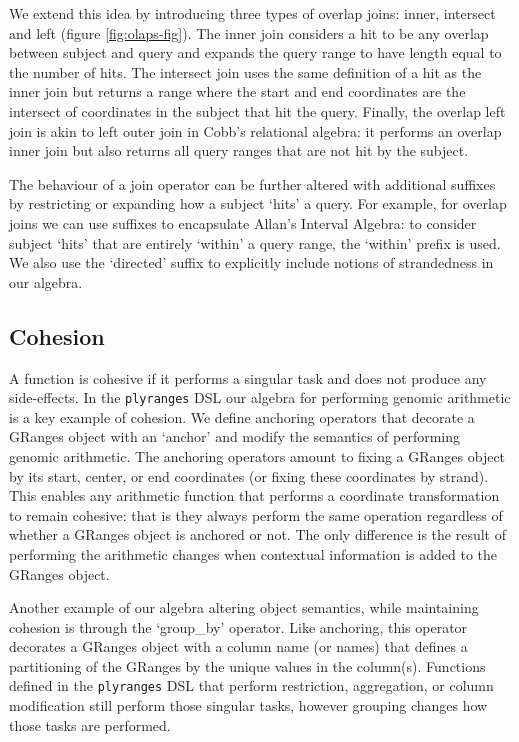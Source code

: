 \documentclass[10pt,letterpaper]{article}
\begin{document}
We extend this idea by introducing three types of overlap joins: inner,
intersect and left (figure \ref{fig:olaps-fig}). The inner join
considers a hit to be any overlap between subject and query and expands
the query range to have length equal to the number of hits. The
intersect join uses the same definition of a hit as the inner join but
returns a range where the start and end coordinates are the intersect of
coordinates in the subject that hit the query. Finally, the overlap left
join is akin to left outer join in Cobb's relational algebra: it
performs an overlap inner join but also returns all query ranges that
are not hit by the subject.

The behaviour of a join operator can be further altered with additional
suffixes by restricting or expanding how a subject `hits' a query. For
example, for overlap joins we can use suffixes to encapsulate Allan's
Interval Algebra: to consider subject `hits' that are entirely `within'
a query range, the `within' prefix is used. We also use the `directed'
suffix to explicitly include notions of strandedness in our algebra.

\subsection{Cohesion}\label{cohesion}

A function is cohesive if it performs a singular task and does not
produce any side-effects. In the \texttt{plyranges} DSL our algebra for
performing genomic arithmetic is a key example of cohesion. We define
anchoring operators that decorate a GRanges object with an `anchor' and
modify the semantics of performing genomic arithmetic. The anchoring
operators amount to fixing a GRanges object by its start, center, or end
coordinates (or fixing these coordinates by strand). This enables any
arithmetic function that performs a coordinate transformation to remain
cohesive: that is they always perform the same operation regardless of
whether a GRanges object is anchored or not. The only difference is the
result of performing the arithmetic changes when contextual information
is added to the GRanges object.

Another example of our algebra altering object semantics, while
maintaining cohesion is through the `group\_by' operator. Like
anchoring, this operator decorates a GRanges object with a column name
(or names) that defines a partitioning of the GRanges by the unique
values in the column(s). Functions defined in the \texttt{plyranges} DSL
that perform restriction, aggregation, or column modification still
perform those singular tasks, however grouping changes how those tasks
are performed.
\end{document}
